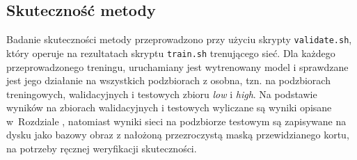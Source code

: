 \subsection*{Skuteczność metody}

Badanie skuteczności metody przeprowadzono przy użyciu skrypty \texttt{validate.sh}, który operuje na rezultatach skryptu \texttt{train.sh} trenującego sieć.
Dla każdego przeprowadzonego treningu, uruchamiany jest wytrenowany model i sprawdzane jest jego działanie na wszystkich podzbiorach z osobna, tzn. na podzbiorach treningowych, walidacyjnych i testowych zbioru \textit{low} i \textit{high}. Na podstawie wyników na zbiorach walidacyjnych i testowych wyliczane są wyniki opisane w~Rozdziale , natomiast wyniki sieci na podzbiorze testowym są zapisywane na dysku jako bazowy obraz z nałożoną przezroczystą maską przewidzianego kortu, na potrzeby ręcznej weryfikacji skuteczności.
